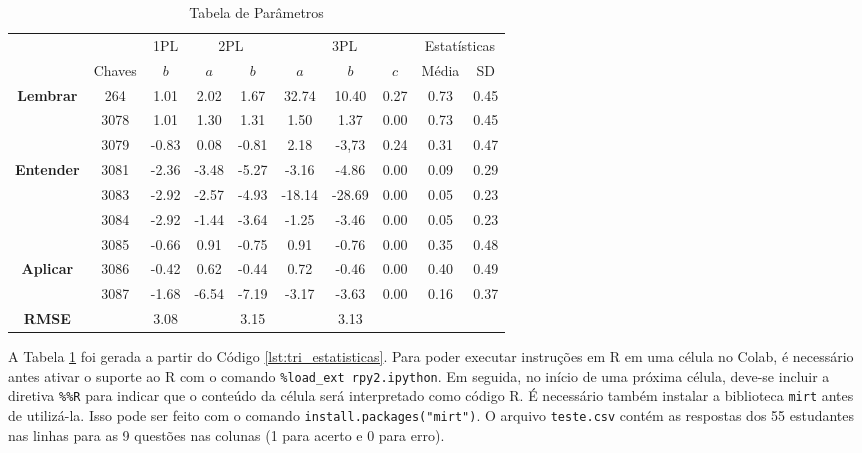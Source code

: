 \begin{table}[!ht]
    \centering
    \caption{Tabela de Parâmetros}
    \label{tab:parameters}
    \begin{tabular}{cccccccccc}
    \toprule
    & & \multicolumn{1}{c}{1PL} & \multicolumn{2}{c}{2PL} & \multicolumn{3}{c}{3PL} & \multicolumn{2}{c}{Estatísticas} \\
    \cmidrule(r){3-3} \cmidrule(r){4-5} \cmidrule(r){6-8} \cmidrule(r){9-10}
    & Chaves & $b$ & $a$ & $b$ & $a$ & $b$ & $c$ & Média & SD \\
    \midrule
    \cellcolor{green!25}\textbf{Lembrar} & 264 & 1.01 & 2.02 & 1.67 & 32.74 & 10.40 & 0.27 & 0.73 & 0.45 \\
    \cellcolor{green!25}
    & 3078 & 1.01 & 1.30 & 1.31 & 1.50 & 1.37 & 0.00 & 0.73 & 0.45 \\
    \cellcolor{green!25}
    & 3079 & -0.83 & 0.08 & -0.81 & 2.18 & -3,73 & 0.24 & 0.31 & 0.47 \\
    \midrule
    \cellcolor{yellow!25}\textbf{Entender} & 3081 & -2.36 & -3.48 & -5.27 & -3.16 & -4.86 & 0.00 & 0.09 & 0.29 \\
    \cellcolor{yellow!25}
    & 3083 & -2.92 & -2.57 & -4.93 & -18.14 & -28.69 & 0.00 & 0.05 & 0.23 \\
    \cellcolor{yellow!25}
    & 3084 & -2.92 & -1.44 & -3.64 & -1.25 & -3.46 & 0.00 & 0.05 & 0.23 \\
    \cellcolor{yellow!25}
    & 3085 & -0.66 & 0.91 & -0.75 & 0.91 & -0.76 & 0.00 & 0.35 & 0.48 \\
    \midrule
    \cellcolor{red!25}
    \textbf{Aplicar} & 3086 & -0.42 & 0.62 & -0.44 & 0.72 & -0.46 & 0.00 & 0.40 & 0.49 \\
    \cellcolor{red!25}
    & 3087 & -1.68 & -6.54 & -7.19 & -3.17 & -3.63 & 0.00 & 0.16 & 0.37 \\
    \bottomrule
    \textbf{RMSE} & & 3.08 & & 3.15 & & 3.13 & & & \\
    \bottomrule
    \end{tabular}
    \end{table}


A Tabela \ref{tab:parameters} foi gerada a partir do Código \ref{lst:tri_estatisticas}. Para poder executar instruções em R em uma célula no Colab, é necessário antes ativar o suporte ao R com o comando \verb|%load_ext rpy2.ipython|. Em seguida, no início de uma próxima célula, deve-se incluir a diretiva \verb|%%R| para indicar que o conteúdo da célula será interpretado como código R. É necessário também instalar a biblioteca \verb|mirt| antes de utilizá-la. Isso pode ser feito com o comando \verb|install.packages("mirt")|. O arquivo \verb|teste.csv| contém as respostas dos 55 estudantes nas linhas para as 9 questões nas colunas (1 para acerto e 0 para erro).

